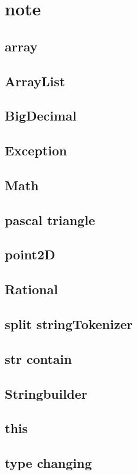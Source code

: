\section{note}
    \subsection{array}
            
    \subsection{ArrayList}
         
    \subsection{BigDecimal}
             
    \subsection{Exception}
        
    \subsection{Math}
        
    \subsection{pascal triangle}
            
    \subsection{point2D}
        
    \subsection{Rational}
            
    \subsection{split stringTokenizer}
        
    \subsection{str contain}
        
    \subsection{Stringbuilder}
             
    \subsection{this}
        
    \subsection{type changing}
        